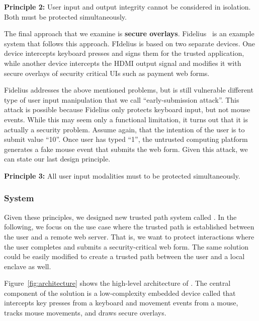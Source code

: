 \begin{tcolorbox}
\textbf{Principle 2:} User input and output integrity cannot be considered in isolation. Both must be protected simultaneously.
\end{tcolorbox}

The final approach that we examine is \textbf{secure overlays}. Fidelius~\cite{Fidelius} is an example system that follows this approach. FIdelius is based on two separate devices. One device intercepts keyboard presses and signs them for the trusted application, while another device intercepts the HDMI output signal and modifies it with secure overlays of security critical UIs such as payment web forms. 

Fidelius addresses the above mentioned problems, but is still vulnerable different type of user input manipulation that we call ``early-submission attack''. This attack is possible because Fidelius only protects keyboard input, but not mouse events. While this may seem only a functional limitation, it turns out that it is actually a security problem. Assume again, that the intention of the user is to submit value ``10''. Once user has typed ``1'', the untrusted computing platform generates a fake mouse event that submits the web form. Given this attack, we can state our last design principle.

\begin{tcolorbox}
\textbf{Principle 3:} All user input modalities must to be protected simultaneously.
\end{tcolorbox}


\subsubsection*{\protection System}

Given these principles, we designed new trusted path system called \protection. In the following, we focus on the use case where the trusted path is established between the user and a remote web server. That is, we want to protect interactions where the user completes and submits a security-critical web form. The same solution could be easily modified to create a trusted path between the user and a local enclave as well.

Figure~\ref{fig:architecture} shows the high-level architecture of \protection. The central component of the solution is a low-complexity embedded device called \hub that intercepts key presses from a keyboard and movement events from a mouse, tracks mouse movements, and draws secure overlays. 

